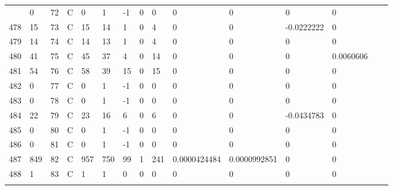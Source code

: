 \begin{longtable}{lllllllllllllll}
\begin{comment}
	477 & 0                 & 72  & C   & 0                 & 1                 & -1                & 0    & 0          & 0              & 0              & 0             & 0            \\
	478 & 15                & 73  & C   & 15                & 14                & 1                 & 0    & 4          & 0              & 0              & -0.0222222    & 0            \\
	479 & 14                & 74  & C   & 14                & 13                & 1                 & 0    & 4          & 0              & 0              & 0             & 0            \\
	480 & 41                & 75  & C   & 45                & 37                & 4                 & 0    & 14         & 0              & 0              & 0             & 0.0060606    \\
	481 & 54                & 76  & C   & 58                & 39                & 15                & 0    & 15         & 0              & 0              & 0             & 0            \\
	482 & 0                 & 77  & C   & 0                 & 1                 & -1                & 0    & 0          & 0              & 0              & 0             & 0            \\
	483 & 0                 & 78  & C   & 0                 & 1                 & -1                & 0    & 0          & 0              & 0              & 0             & 0            \\
	484 & 22                & 79  & C   & 23                & 16                & 6                 & 0    & 6          & 0              & 0              & -0.0434783    & 0            \\
	485 & 0                 & 80  & C   & 0                 & 1                 & -1                & 0    & 0          & 0              & 0              & 0             & 0            \\
	486 & 0                 & 81  & C   & 0                 & 1                 & -1                & 0    & 0          & 0              & 0              & 0             & 0            \\
	487 & 849               & 82  & C   & 957               & 750               & 99                & 1    & 241        & 0.0000424484   & 0.0000992851   & 0             & 0            \\
	488 & 1                 & 83  & C   & 1                 & 1                 & 0                 & 0    & 0          & 0              & 0              & 0             & 0            \\

\end{comment}
\end{longtable}
